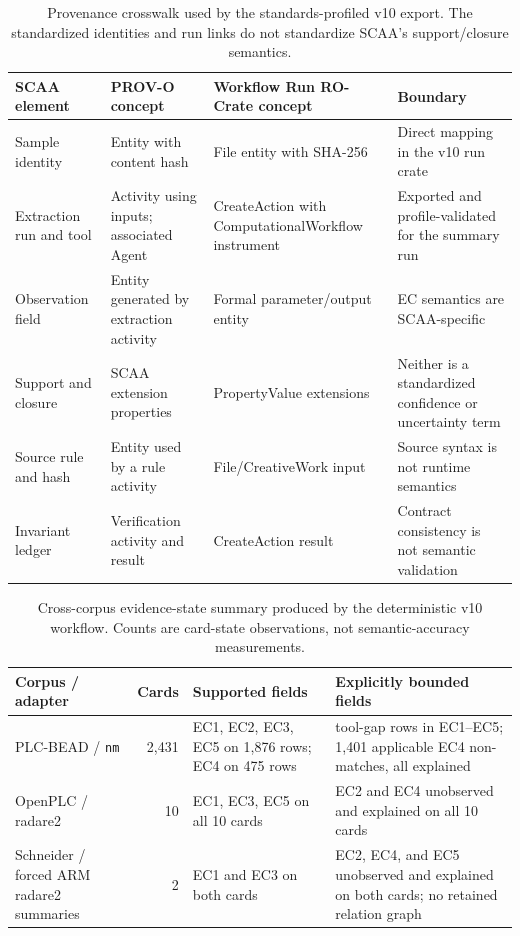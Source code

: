 \documentclass[a4paper,fleqn]{cas-dc}
\begin{document}
\begin{table}[t]
\centering
\small
\caption{Provenance crosswalk used by the standards-profiled v10 export. The standardized identities and run links do not standardize SCAA's support/closure semantics.}
\label{tab:provenance_crosswalk}
\begin{tabularx}{\textwidth}{>{\raggedright\arraybackslash}p{}>{\raggedright\arraybackslash}p{}>{\raggedright\arraybackslash}p{}>{\raggedright\arraybackslash}X}
\toprule
SCAA element & PROV-O concept & Workflow Run RO-Crate concept & Boundary \\
\midrule
Sample identity & Entity with content hash & File entity with SHA-256 & Direct mapping in the v10 run crate \\
Extraction run and tool & Activity using inputs; associated Agent & CreateAction with ComputationalWorkflow instrument & Exported and profile-validated for the summary run \\
Observation field & Entity generated by extraction activity & Formal parameter/output entity & EC semantics are SCAA-specific \\
Support and closure & SCAA extension properties & PropertyValue extensions & Neither is a standardized confidence or uncertainty term \\
Source rule and hash & Entity used by a rule activity & File/CreativeWork input & Source syntax is not runtime semantics \\
Invariant ledger & Verification activity and result & CreateAction result & Contract consistency is not semantic validation \\
\bottomrule
\end{tabularx}
\end{table}

\begin{table}[t]
\centering
\small
\caption{Cross-corpus evidence-state summary produced by the deterministic v10 workflow. Counts are card-state observations, not semantic-accuracy measurements.}
\label{tab:cross_corpus_states}
\begin{tabularx}{\textwidth}{>{\raggedright\arraybackslash}p{}r>{\raggedright\arraybackslash}p{}>{\raggedright\arraybackslash}X}
\toprule
Corpus / adapter & Cards & Supported fields & Explicitly bounded fields \\
\midrule
PLC-BEAD / \texttt{nm} & 2,431 & EC1, EC2, EC3, EC5 on 1,876 rows; EC4 on 475 rows & 555 tool-gap rows in EC1--EC5; 1,401 applicable EC4 non-matches, all explained \\
OpenPLC / radare2 & 10 & EC1, EC3, EC5 on all 10 cards & EC2 and EC4 unobserved and explained on all 10 cards \\
Schneider / forced ARM radare2 summaries & 2 & EC1 and EC3 on both cards & EC2, EC4, and EC5 unobserved and explained on both cards; no retained relation graph \\
\bottomrule
\end{tabularx}
\end{table}
\end{document}
